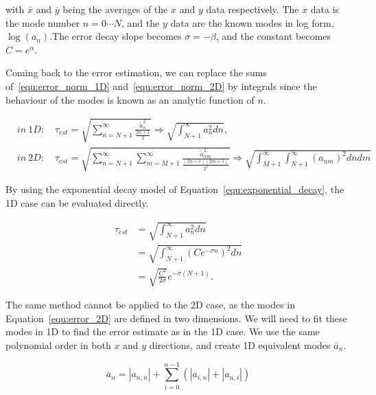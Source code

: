 \noindent
with \(\overline{x}\) and \(\overline{y}\) being the averages of the \(x\) and \(y\) data
respectively. The \(x\) data is the mode number \(n = 0 \cdots N\), and the \(y\) data are the known
modes in log form, \( \log(a_n) \).The error decay slope becomes \(\sigma = - \beta \), and the constant becomes \(C =
e^\alpha \).

Coming back to the error estimation, we can replace the sums of~\ref{equ:error_norm_1D}
and~\ref{equ:error_norm_2D} by integrals since the behaviour of the modes is known as an analytic
function of \(n\).

\begin{align}
    &{in}\ 1D: \quad \tau_{est} = \sqrt{\sum_{n = N + 1}^{\infty } \frac{\widetilde{a}_n^2}{\frac{2n + 1}{2}}} 
               \Rightarrow \sqrt{\int_{N + 1}^{\infty } a_n^2 dn}, \label{equ:error_1D}
    \\
    &{in}\ 2D: \quad \tau_{est} = \sqrt{\sum_{n = N + 1}^{\infty }\sum_{m = M + 1}^{\infty}\frac{\widetilde{a}^2_{nm}}{\frac{(2n + 1)(2m + 1)}{2^2}}}
               \Rightarrow \sqrt{\int_{M+1}^{\infty }\int_{N + 1 }^{\infty}{(a_{nm})}^2 dn dm} \label{equ:error_2D}
\end{align}

\noindent
By using the exponential decay model of Equation~\ref{equ:exponential_decay}, the 1D case can be
evaluated directly.

\begin{equation}
    \begin{aligned}
        \tau_{est} &= \sqrt{\int_{N + 1}^{\infty } a_n^2 dn} \\
        &= \sqrt{\int_{N + 1}^{\infty } {\left( Ce^{-\sigma n} \right)}^2 dn} \\
        &= \sqrt{\frac{C^2}{2\sigma }}e^{-\sigma (N + 1)}. 
    \end{aligned}
\end{equation}

The same method cannot be applied to the 2D case, as the modes in Equation~\ref{equ:error_2D} are
defined in two dimensions. We will need to fit these modes in 1D to find the error estimate as in
the 1D case. We use the same polynomial order in both \(x\) and \(y\) directions, and create 1D
equivalent modes \(\overline{a}_n\). 

\begin{equation}
    \overline{a}_n = \left| a_{n,n} \right| + \sum_{i = 0}^{n-1} \left( \left| a_{i, n} \right| + \left| a_{n, i} \right| \right)
\end{equation}

